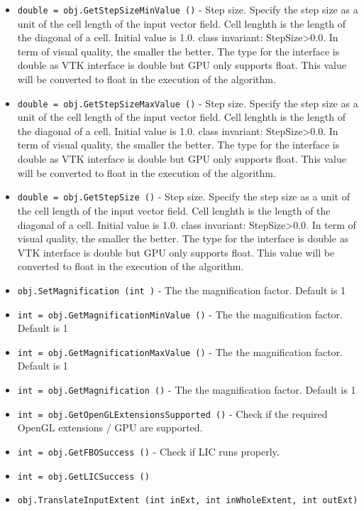 \begin{itemize}
\item  \verb|double = obj.GetStepSizeMinValue ()| -  Step size.
 Specify the step size as a unit of the cell length of the input vector
 field. Cell lenghth is the length of the diagonal of a cell.
 Initial value is 1.0.
 class invariant: StepSize>0.0.
 In term of visual quality, the smaller the better.
 The type for the interface is double as VTK interface is double
 but GPU only supports float. This value will be converted to
 float in the execution of the algorithm.

\item  \verb|double = obj.GetStepSizeMaxValue ()| -  Step size.
 Specify the step size as a unit of the cell length of the input vector
 field. Cell lenghth is the length of the diagonal of a cell.
 Initial value is 1.0.
 class invariant: StepSize>0.0.
 In term of visual quality, the smaller the better.
 The type for the interface is double as VTK interface is double
 but GPU only supports float. This value will be converted to
 float in the execution of the algorithm.

\item  \verb|double = obj.GetStepSize ()| -  Step size.
 Specify the step size as a unit of the cell length of the input vector
 field. Cell lenghth is the length of the diagonal of a cell.
 Initial value is 1.0.
 class invariant: StepSize>0.0.
 In term of visual quality, the smaller the better.
 The type for the interface is double as VTK interface is double
 but GPU only supports float. This value will be converted to
 float in the execution of the algorithm.

\item  \verb|obj.SetMagnification (int )| -  The the magnification factor. Default is 1

\item  \verb|int = obj.GetMagnificationMinValue ()| -  The the magnification factor. Default is 1

\item  \verb|int = obj.GetMagnificationMaxValue ()| -  The the magnification factor. Default is 1

\item  \verb|int = obj.GetMagnification ()| -  The the magnification factor. Default is 1

\item  \verb|int = obj.GetOpenGLExtensionsSupported ()| -  Check if the required OpenGL extensions / GPU are supported.

\item  \verb|int = obj.GetFBOSuccess ()| -  Check if LIC runs properly.

\item  \verb|int = obj.GetLICSuccess ()|

\item  \verb|obj.TranslateInputExtent (int inExt, int inWholeExtent, int outExt)|

\end{itemize}
